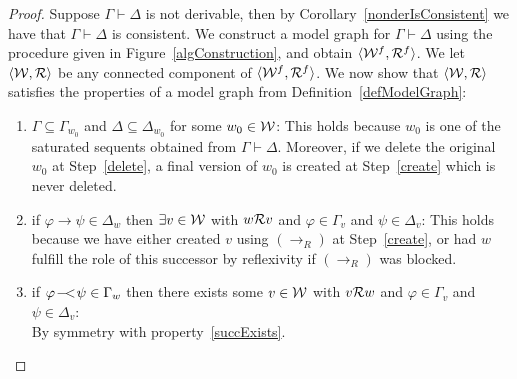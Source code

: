 \documentclass{llncs}
\numberwithin{equation}{section}
\newcommand{\pair}[2]{\langle #1, #2\rangle}
\newcommand{\ExImp}{\rightarrow}
\newcommand{\sequent}{\vdash}
\newcommand{\Imp}{\rightarrow}
\newcommand{\WeakImp}{
\begin{picture}(10,10)
     \put(1,0){$-$}
     \put(7,0){$<$}
   \end{picture}
   \;\; 
}
\newcommand{\mycal}[1]{
        {\cal{#1}}
}
\newcommand{\ImpRightRule}{({\Imp_R})}
\begin{document}
\begin{proof}
Suppose $\Gamma \sequent \Delta$ is not derivable, then by Corollary~\ref{nonderIsConsistent} we have that $\Gamma \sequent \Delta$ is consistent. We construct a model graph for $\Gamma \sequent \Delta$ using the procedure given in Figure~\ref{algConstruction}, and obtain $\pair{\mycal{W}^f}{\mycal{R}^f}$. We let $\pair{\mycal{W}}{\mycal{R}}$ be any connected component of $\pair{\mycal{W}^f}{\mycal{R}^f}$. We now show that $\pair{\mycal{W}}{\mycal{R}}$ satisfies the properties of a model graph from Definition~\ref{defModelGraph}:
	\begin{enumerate}
		\item $\Gamma \subseteq \Gamma_{w_0}$
          and $\Delta \subseteq \Delta_{w_0}$ for some $w_0 \in
          \mycal{W}$: This holds because $w_0$ is one of the saturated
          sequents obtained from $\Gamma \sequent \Delta$.  Moreover,
          if we delete the original $w_0$ at Step~\ref{delete}, a
          final version of $w_0$ is created at Step~\ref{create} which
          is never deleted.
          
		\item\label{succExists} if $\varphi \ExImp
          \psi \in \Delta_w$ then $\exists v \in \mycal{W}$ with $w
          \mycal{R} v$ and $\varphi \in \Gamma_{v}$ and $\psi \in
          \Delta_{v}$: This holds because we have either created $v$
          using $\ImpRightRule$ at Step~\ref{create}, or had $w$
          fulfill the role of this successor by reflexivity if
          $\ImpRightRule$ was blocked.
          
		\item if $\varphi \WeakImp \psi \in \Gamma_w$ then there exists some $v \in \mycal{W}$ with $v \mycal{R} w$ and $\varphi \in \Gamma_{v}$ and $\psi \in \Delta_{v}$: \\
			By symmetry with property~\ref{succExists}.
			

\end{enumerate}
\end{proof}
\end{document}
